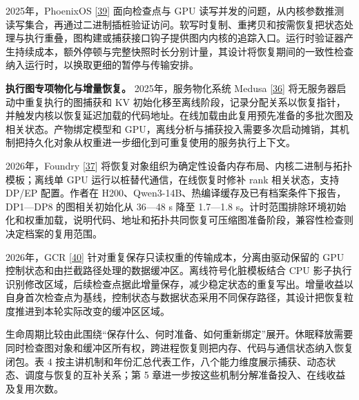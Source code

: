 \documentclass[UTF8,10.5pt,fontset=windows]{ctexart}
\begin{document}
2025年，PhoenixOS {[}\protect\hyperlink{ref-wei2025phoenixos}{39}{]}
面向检查点与 GPU
读写并发的问题，从内核参数推测读写集合，再通过二进制插桩验证访问。软写时复制、重拷贝和按需恢复把状态处理与执行重叠，图构建或捕获接口钩子提供图内内核的追踪入口。运行时验证器产生持续成本，额外停顿与完整快照时长分别计量，其设计将恢复期间的一致性检查纳入运行时，以换取更细的暂停与传输安排。

\textbf{执行图专项物化与增量恢复。} 2025年，服务物化系统 Medusa
{[}\protect\hyperlink{ref-zeng2025medusa}{36}{]}
将无服务器启动中重复执行的图捕获和 KV
初始化移至离线阶段，记录分配关系以恢复指针，并触发内核以恢复延迟加载的代码地址。在线加载由此复用预先准备的多批次图及相关状态。产物绑定模型和
GPU，离线分析与捕获投入需要多次启动摊销，其机制把持久化对象从权重进一步细化到可重复使用的服务执行上下文。

2026年，Foundry {[}\protect\hyperlink{ref-liu2026foundry}{37}{]}
将恢复对象组织为确定性设备内存布局、内核二进制与拓扑模板；离线单 GPU
运行以桩替代通信，在线恢复时修补 rank 相关状态，支持 DP/EP 配置。作者在
H200、Qwen3-14B、热编译缓存及已有档案条件下报告，DP1---DP8
的图相关初始化从 36---48 s 降至 1.7---1.8
s。计时范围排除环境初始化和权重加载，说明代码、地址和拓扑共同恢复可压缩图准备阶段，兼容性检查则决定档案的复用范围。

2026年，GCR {[}\protect\hyperlink{ref-zeng2026gcr}{40}{]}
针对重复保存只读权重的传输成本，分离由驱动保留的 GPU
控制状态和由拦截路径处理的数据缓冲区。离线符号化脏模板结合 CPU
影子执行识别修改区域，后续检查点据此增量保存，减少稳定状态的重复写出。增量收益以自身首次检查点为基线，控制状态与数据状态采用不同保存路径，其设计把恢复粒度推进到本轮实际改变的缓冲区区域。

生命周期比较由此围绕``保存什么、何时准备、如何重新绑定''展开。休眠释放需要同时检查图对象和缓冲区所有权，跨进程恢复则把内存、代码与通信状态纳入恢复闭包。表
4
按主讲机制和年份汇总代表工作，八个能力维度展示捕获、动态状态、调度与恢复的互补关系；第
5 章进一步按这些机制分解准备投入、在线收益及复用次数。
\end{document}
